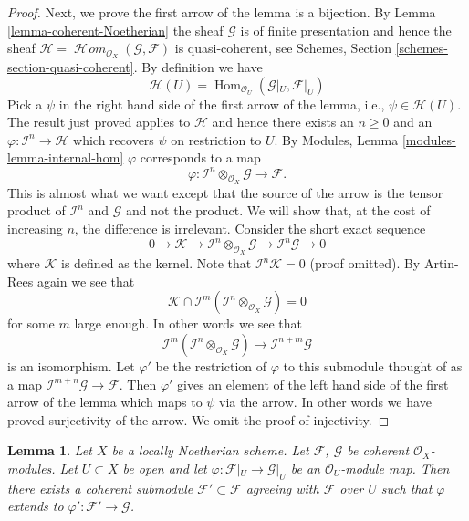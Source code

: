 \documentclass{stacks-project}
\theoremstyle{plain}
\newtheorem{lemma}[subsection]{Lemma}
\theoremstyle{definition}
\theoremstyle{remark}
\numberwithin{equation}{subsection}
\def\Hom{\mathop{\mathrm{Hom}}\nolimits}
\def\SheafHom{\mathop{\mathcal{H}\!\mathit{om}}\nolimits}
\begin{document}
\begin{proof}
\medskip\noindent
Next, we prove the first arrow of the lemma is a bijection.
By Lemma \ref{lemma-coherent-Noetherian} the sheaf $\mathcal{G}$
is of finite presentation and hence the sheaf
$\mathcal{H} = \SheafHom_{\mathcal{O}_X}(\mathcal{G}, \mathcal{F})$
is quasi-coherent, see
Schemes, Section \ref{schemes-section-quasi-coherent}.
By definition we have
$$
\mathcal{H}(U)
=
\Hom_{\mathcal{O}_U}(\mathcal{G}|_U, \mathcal{F}|_U)
$$
Pick a $\psi$ in the right hand side of the first arrow of the
lemma, i.e.,  $\psi \in \mathcal{H}(U)$. The result just proved applies
to $\mathcal{H}$ and hence there exists an $n \geq 0$ and an
$\varphi : \mathcal{I}^n \to \mathcal{H}$ which recovers
$\psi$ on restriction to $U$. By
Modules, Lemma \ref{modules-lemma-internal-hom}
$\varphi$ corresponds to a map
$$
\varphi :
\mathcal{I}^n \otimes_{\mathcal{O}_X} \mathcal{G}
\longrightarrow
\mathcal{F}.
$$
This is almost what we want except that the source of the arrow
is the tensor product of $\mathcal{I}^n$ and $\mathcal{G}$
and not the product. We will show that, at the cost of increasing $n$,
the difference is irrelevant. Consider the short exact sequence
$$
0 \to \mathcal{K} \to
\mathcal{I}^n \otimes_{\mathcal{O}_X} \mathcal{G} \to
\mathcal{I}^n\mathcal{G} \to 0
$$
where $\mathcal{K}$ is defined as the kernel. Note that
$\mathcal{I}^n\mathcal{K} = 0$ (proof omitted). By Artin-Rees
again we see that
$$
\mathcal{K}
\cap
\mathcal{I}^m(\mathcal{I}^n \otimes_{\mathcal{O}_X} \mathcal{G})
=
0
$$
for some $m$ large enough. In other words we see that
$$
\mathcal{I}^m(\mathcal{I}^n \otimes_{\mathcal{O}_X} \mathcal{G})
\longrightarrow
\mathcal{I}^{n + m}\mathcal{G}
$$
is an isomorphism. Let $\varphi'$ be the restriction of
$\varphi$ to this submodule thought of as a map
$\mathcal{I}^{m + n}\mathcal{G} \to \mathcal{F}$.
Then $\varphi'$ gives an element
of the left hand side of the first arrow of the lemma which
maps to $\psi$ via the arrow. In other words we have proved surjectivity
of the arrow. We omit the proof of injectivity.
\end{proof}

\begin{lemma}
\label{lemma-extend-coherent}
Let $X$ be a locally Noetherian scheme. Let $\mathcal{F}$, $\mathcal{G}$
be coherent $\mathcal{O}_X$-modules. Let $U \subset X$ be open and
let $\varphi : \mathcal{F}|_U \to \mathcal{G}|_U$ be an
$\mathcal{O}_U$-module map. Then there exists a coherent
submodule $\mathcal{F}' \subset \mathcal{F}$ agreeing with
$\mathcal{F}$ over $U$ such that $\varphi$ extends to
$\varphi' : \mathcal{F}' \to \mathcal{G}$.
\end{lemma}
\end{document}
